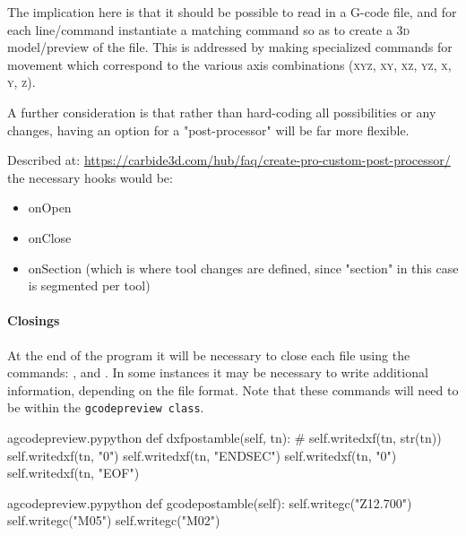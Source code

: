 \documentclass{ltxdoc}
\begin{document}
The implication here is that it should be possible to read in a G-code file, and for each line/\allowbreak command instantiate a matching command so as to create a \textsc{3d} model/preview  of the file. This is addressed by making specialized commands for movement which correspond to the various axis combinations (\textsc{xyz}, \textsc{xy}, \textsc{xz}, \textsc{yz}, \textsc{x}, \textsc{y}, \textsc{z}).

A further consideration is that rather than hard-coding all possibilities or any changes, having an option for a "post-processor" will be far more flexible.

Described at: \url{https://carbide3d.com/hub/faq/create-pro-custom-post-processor/} the necessary hooks would be:

\begin{itemize}
\item onOpen
\item onClose
\item onSection (which is where tool changes are defined, since "section" in this case is segmented per tool)
\end{itemize}

\paragraph{Closings}

At the end of the program it will be necessary to close each file using the commands: 
, and
. %
In some instances it may be necessary to write additional information, depending on the file format. Note that these commands will need to be within the \verb|gcodepreview class|.
 
\lstset{firstnumber=\thegcpy}
\begin{writecode}{a}{gcodepreview.py}{python}
    def dxfpostamble(self, tn):
#        self.writedxf(tn, str(tn))
        self.writedxf(tn, "0")
        self.writedxf(tn, "ENDSEC")
        self.writedxf(tn, "0")
        self.writedxf(tn, "EOF")
        
\end{writecode}
\addtocounter{gcpy}{7}

\lstset{firstnumber=\thegcpy}
\begin{writecode}{a}{gcodepreview.py}{python}
    def gcodepostamble(self):
        self.writegc("Z12.700")
        self.writegc("M05")
        self.writegc("M02")
        
\end{writecode}
\addtocounter{gcpy}{5}
\end{document}
